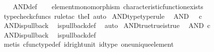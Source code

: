 \begin{isabellebody}
%
\isadelimproof
\ \ %
\endisadelimproof
%
\isatagproof
{}\isamarkupfalse%
\ AND{\isacharunderscore}{\kern0pt}def\isanewline
\ \ \isamarkupfalse%
\ element{\isacharunderscore}{\kern0pt}monomorphism\ characteristic{\isacharunderscore}{\kern0pt}function{\isacharunderscore}{\kern0pt}exists\isanewline
\ \ \isamarkupfalse%
\ {\isacharparenleft}{\kern0pt}typecheck{\isacharunderscore}{\kern0pt}cfuncs{\isacharcomma}{\kern0pt}\ rule{\isacharunderscore}{\kern0pt}tac\ the{}I{}{\isacharcomma}{\kern0pt}\ auto{\isacharparenright}{\kern0pt}%
\endisatagproof
{\isafoldproof}%
%
\isadelimproof
\isanewline
%
\endisadelimproof
\isanewline
{}\isamarkupfalse%
\ AND{\isacharunderscore}{\kern0pt}type{\isacharbrackleft}{\kern0pt}type{\isacharunderscore}{\kern0pt}rule{\isacharbrackright}{\kern0pt}{\isacharcolon}{\kern0pt}\isanewline
\ \ {\isachardoublequoteopen}AND\ {\isacharcolon}{\kern0pt}\ {\isasymOmega}\ {\isasymtimes}\isactrlsub c\ {\isasymOmega}\ {\isasymrightarrow}\ {\isasymOmega}{\isachardoublequoteclose}\isanewline
%
\isadelimproof
\ \ %
\endisadelimproof
%
\isatagproof
{}\isamarkupfalse%
\ AND{\isacharunderscore}{\kern0pt}is{\isacharunderscore}{\kern0pt}pullback\ \isamarkupfalse%
\ is{\isacharunderscore}{\kern0pt}pullback{\isacharunderscore}{\kern0pt}def\ \isamarkupfalse%
\ auto%
\endisatagproof
{\isafoldproof}%
%
\isadelimproof
\isanewline
%
\endisadelimproof
\isanewline
{}\isamarkupfalse%
\ AND{\isacharunderscore}{\kern0pt}true{\isacharunderscore}{\kern0pt}true{\isacharunderscore}{\kern0pt}is{\isacharunderscore}{\kern0pt}true{\isacharcolon}{\kern0pt}\isanewline
\ \ {\isachardoublequoteopen}AND\ {\isasymcirc}\isactrlsub c\ {\isasymlangle}{\isasymt}{\isacharcomma}{\kern0pt}{\isasymt}{\isasymrangle}\ {\isacharequal}{\kern0pt}\ {\isasymt}{\isachardoublequoteclose}\isanewline
%
\isadelimproof
\ \ %
\endisadelimproof
%
\isatagproof
{}\isamarkupfalse%
\ AND{\isacharunderscore}{\kern0pt}is{\isacharunderscore}{\kern0pt}pullback\ \isamarkupfalse%
\ is{\isacharunderscore}{\kern0pt}pullback{\isacharunderscore}{\kern0pt}def\isanewline
\ \ \isamarkupfalse%
\ {\isacharparenleft}{\kern0pt}metis\ cfunc{\isacharunderscore}{\kern0pt}type{\isacharunderscore}{\kern0pt}def\ id{\isacharunderscore}{\kern0pt}right{\isacharunderscore}{\kern0pt}unit\ id{\isacharunderscore}{\kern0pt}type\ one{\isacharunderscore}{\kern0pt}unique{\isacharunderscore}{\kern0pt}element{\isacharparenright}{\kern0pt}%

\end{isabellebody}
